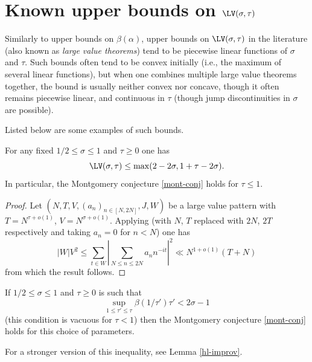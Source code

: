 \section{Known upper bounds on \texorpdfstring{$\LV(\sigma,\tau)$}{LV(sigma,tau)}}

Similarly to upper bounds on $\beta(\alpha)$, upper bounds on $\LV(\sigma,\tau)$ in the literature (also known as \emph{large value theorems}) tend to be piecewise linear functions of $\sigma$ and $\tau$.  Such bounds often tend to be convex initially (i.e., the maximum of several linear functions), but when one combines multiple large value theorems together, the bound is usually neither convex nor concave, though it often remains piecewise linear, and continuous in $\tau$ (though jump discontinuities in $\sigma$ are possible).

Listed below are some examples of such bounds.

\begin{theorem}\label{l2-mvt} For any fixed $1/2 \leq \sigma \leq 1$ and $\tau\geq 0$ one has
    $$ \LV(\sigma,\tau) \leq \max( 2-2\sigma, 1 + \tau - 2 \sigma).$$
In particular, the Montgomery conjecture \eqref{mont-conj} holds for $\tau \leq 1$.
\end{theorem}


\begin{proof}
Let $(N,T,V,(a_n)_{n \in [N,2N]},J,W)$ be a large value pattern with $T = N^{\tau + o(1)}$, $V = N^{\sigma + o(1)}$. Applying \cite[Theorem~9.4]{ik} (with $N$, $T$ replaced with $2N$, $2T$ respectively and taking $a_n = 0$ for $n < N$) one has
\[
|W|V^2 \le \sum_{t \in W} \left|\sum_{N \le n \le 2N} a_n n^{-it}\right|^2 \ll N^{1 + o(1)}(T + N)
\]
from which the result follows.
\end{proof}

\begin{theorem}\label{montgomery-lv} If $1/2 \leq \sigma \leq 1$ and $\tau \geq 0$ is such that
\begin{equation}\label{tab}
\sup_{1 \leq \tau' \leq \tau} \beta(1/\tau') \tau' < 2\sigma - 1
\end{equation}
(this condition is vacuous for $\tau < 1$) then the Montgomery conjecture \eqref{mont-conj} holds for this choice of parameters.
\end{theorem}

For a stronger version of this inequality, see Lemma \ref{hl-improv}.

